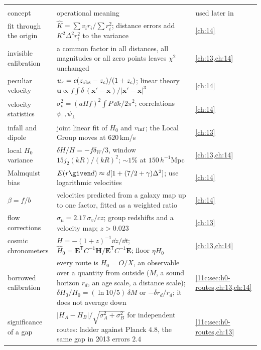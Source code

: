 \begin{center}
\small
\renewcommand{\arraystretch}{1.15}
\begin{tabularx}{\linewidth}{@{}>{\raggedright\arraybackslash}p{3.3cm}
                               >{\raggedright\arraybackslash}X
                               >{\raggedright\arraybackslash}p{2.0cm}@{}}
\toprule
\multicolumn{3}{@{}l}{\textbf{The local Universe}}\\
concept & operational meaning & used later in\\\midrule
fit through the origin & $\hat K=\sum v_ir_i/\sum r_i^2$; distance errors add $K^2\Delta^2r_i^2$ to the variance & \cref{ch:14}\\
invisible calibration & a common factor in all distances, all magnitudes or all zero points leaves $\chi^2$ unchanged & \cref{ch:13,ch:14}\\
peculiar velocity & $u_r=c(z_{\rm obs}-z_c)/(1+z_c)$; linear theory $\bm u\propto f\int\delta\,(\bm x'-\bm x)/|\bm x'-\bm x|^3$ & \cref{ch:14}\\
velocity statistics & $\sigma_v^2=(aHf)^2\int P\,\dd k/2\pi^2$; correlations $\psi_\parallel,\psi_\perp$ & \cref{ch:14}\\
infall and dipole & joint linear fit of $H_0$ and $v_{\rm inf}$; the Local Group moves at $620$\,km/s & \cref{ch:13}\\
local $H_0$ variance & $\delta H/H=-f\delta_W/3$, window $15j_2(kR)/(kR)^2$; $\sim\!1\%$ at $150\,h^{-1}$Mpc & \cref{ch:13,ch:14}\\
Malmquist bias & $E(r\given d)\approx d[1+(7/2+\gamma)\Delta^2]$; use logarithmic velocities & \cref{ch:14}\\
$\beta=f/b$ & velocities predicted from a galaxy map up to one factor, fitted as a weighted ratio & \cref{ch:14}\\
flow corrections & $\sigma_\mu=2.17\,\sigma_v/cz$; group redshifts and a velocity map; $z>0.023$ & \cref{ch:13}\\
cosmic chronometers & $H=-(1+z)^{-1}\dd z/\dd t$; $\hat H_0=\bm E^{\mathsf T}C^{-1}\bm H/\bm E^{\mathsf T}C^{-1}\bm E$; floor $\eta H_0$ & \cref{ch:13,ch:14}\\
borrowed calibration & every route is $H_0=O/X$, an observable over a quantity from outside ($M$, a sound horizon $r_d$, an age scale, a distance scale); $\delta H_0/H_0=(\ln10/5)\,\delta M$ or $-\delta r_d/r_d$; it does not average down & \cref{11c:sec:h0-routes,ch:13,ch:14}\\
significance of a gap & $|H_A-H_B|/\sqrt{\sigma_A^2+\sigma_B^2}$ for independent routes: ladder against Planck $4.8$, the same gap in 2013 errors $2.4$ & \cref{11c:sec:h0-routes,ch:13}\\
\bottomrule
\end{tabularx}
\end{center}
  